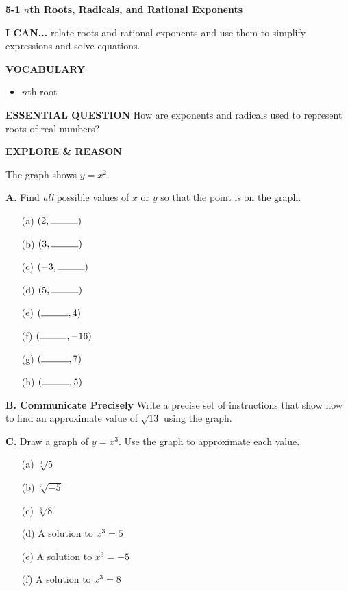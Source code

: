 \documentclass{article}
\newenvironment{lesson-meta}{}{}
\newenvironment{model-discuss}{}{}
\begin{document}
\begin{lesson-meta}
\textbf{5-1 $n$th Roots, Radicals, and Rational Exponents}

\textbf{I CAN...} relate roots and rational exponents and use them to simplify expressions and solve equations.

\textbf{VOCABULARY}
\begin{itemize}
    \item $n$th root
\end{itemize}

\textbf{ESSENTIAL QUESTION} How are exponents and radicals used to represent roots of real numbers?
\end{lesson-meta}

\begin{model-discuss}
\textbf{EXPLORE \& REASON}

The graph shows $y = x^2$.


\textbf{A.} Find \textit{all} possible values of $x$ or $y$ so that the point is on the graph.
\begin{enumerate}
    \item[(a)] $(2, \rule{1cm}{0.15mm})$
    \item[(b)] $(3, \rule{1cm}{0.15mm})$
    \item[(c)] $(-3, \rule{1cm}{0.15mm})$
    \item[(d)] $(5, \rule{1cm}{0.15mm})$
    \item[(e)] $(\rule{1cm}{0.15mm}, 4)$
    \item[(f)] $(\rule{1cm}{0.15mm}, -16)$
    \item[(g)] $(\rule{1cm}{0.15mm}, 7)$
    \item[(h)] $(\rule{1cm}{0.15mm}, 5)$
\end{enumerate}

\textbf{B. Communicate Precisely} Write a precise set of instructions that show how to find an approximate value of $\sqrt{13}$ using the graph.

\textbf{C.} Draw a graph of $y = x^3$. Use the graph to approximate each value.
\begin{enumerate}
    \item[(a)] $\sqrt[3]{5}$
    \item[(b)] $\sqrt[3]{-5}$
    \item[(c)] $\sqrt[3]{8}$
    \item[(d)] A solution to $x^3 = 5$
    \item[(e)] A solution to $x^3 = -5$
    \item[(f)] A solution to $x^3 = 8$
\end{enumerate}
\end{model-discuss}
\end{document}
